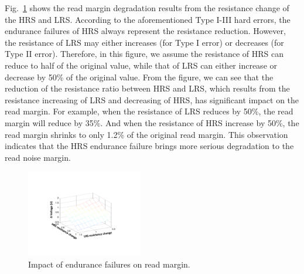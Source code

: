 Fig.~\ref{fig:margin} shows the read margin degradation results from the resistance change of the HRS and LRS. According to the aforementioned Type I-III hard errors, the endurance failures of HRS always represent the resistance reduction. However, the resistance of LRS may either increases (for Type I error) or decreases (for Type II error). Therefore, in this figure, we assume the resistance of HRS can reduce to half of the original value, while that of LRS can either increase or decrease by 50\% of the original value. From the figure, we can see that the reduction of the resistance ratio between HRS and LRS, which results from the resistance increasing of LRS and decreasing of HRS, has significant impact on the read margin. For example, when the resistance of LRS reduces by 50\%, the read margin will reduce by 35\%. And when the resistance of HRS increase by 50\%, the read margin shrinks to only 1.2\% of the original read margin. This observation indicates that the HRS endurance failure brings more serious degradation to the read noise margin. 


\begin{figure}[!t]
\centering
    \includegraphics[width=2in]{./fig/margin.pdf}
\caption{Impact of endurance failures on read margin.}
\label{fig:margin}
\end{figure}


